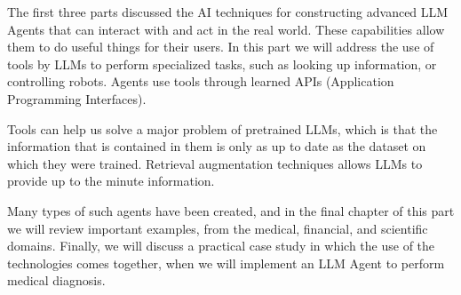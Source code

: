 The first three parts discussed the  AI techniques for constructing advanced LLM Agents that can interact with and act in the real world. These capabilities allow them to do useful things for their users. In this  part we will address the use of tools by LLMs to perform specialized tasks, such as looking up information, or controlling robots.  Agents use tools through learned APIs (Application Programming Interfaces).

Tools can help us solve a major problem of pretrained LLMs, which is that the information that is contained in them is only as up to date as the dataset on which they were trained. Retrieval augmentation techniques allows LLMs to provide up to the minute information.  

Many types of such agents have been created, and in the final chapter of this part we will review important examples, from the medical, financial, and scientific domains. Finally, we will discuss a practical case study in which the use of the technologies comes together, when we will implement an LLM Agent to perform medical diagnosis.
